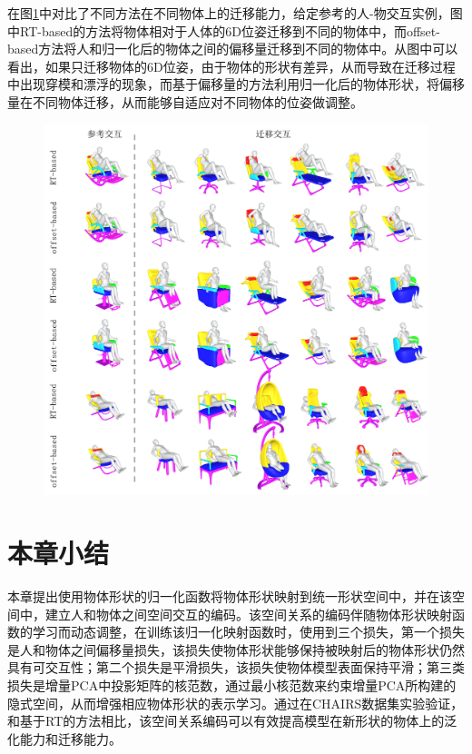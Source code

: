 
在图\ref{fig:interaction_transfer}中对比了不同方法在不同物体上的迁移能力，给定参考的人-物交互实例，图中RT-based的方法将物体相对于人体的6D位姿迁移到不同的物体中，而offset-based方法将人和归一化后的物体之间的偏移量迁移到不同的物体中。从图中可以看出，如果只迁移物体的6D位姿，由于物体的形状有差异，从而导致在迁移过程中出现穿模和漂浮的现象，而基于偏移量的方法利用归一化后的物体形状，将偏移量在不同物体迁移，从而能够自适应对不同物体的位姿做调整。

\begin{figure}[!htbp]
	\centering
	\includegraphics{Img/interaction_transfer_2}
	\label{fig:interaction_transfer}
\end{figure}

\section{本章小结}
本章提出使用物体形状的归一化函数将物体形状映射到统一形状空间中，并在该空间中，建立人和物体之间空间交互的编码。该空间关系的编码伴随物体形状映射函数的学习而动态调整，在训练该归一化映射函数时，使用到三个损失，第一个损失是人和物体之间偏移量损失，该损失使物体形状能够保持被映射后的物体形状仍然具有可交互性；第二个损失是平滑损失，该损失使物体模型表面保持平滑；第三类损失是增量PCA中投影矩阵的核范数，通过最小核范数来约束增量PCA所构建的隐式空间，从而增强相应物体形状的表示学习。通过在CHAIRS数据集实验验证，和基于RT的方法相比，该空间关系编码可以有效提高模型在新形状的物体上的泛化能力和迁移能力。